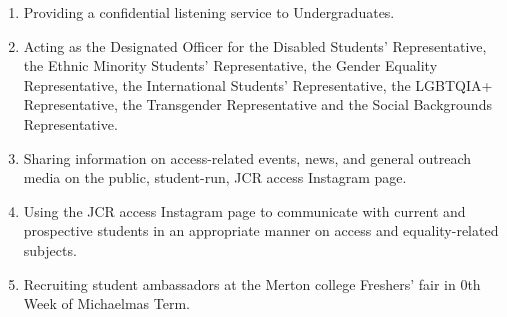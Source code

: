 \begin{enumerate}
	\item Providing a confidential listening service to Undergraduates.
	\item Acting as the Designated Officer for the Disabled Students’ Representative, the Ethnic Minority Students’ Representative, the Gender Equality Representative, the International Students’ Representative, the LGBTQIA+ Representative, the Transgender Representative and the Social Backgrounds Representative.
	\item Sharing information on access-related events, news, and general outreach media on the public, student-run, JCR access Instagram page. 
	\item Using the JCR access Instagram page to communicate with current and prospective students in an appropriate manner on access and equality-related subjects. 
	\item Recruiting student ambassadors at the Merton college Freshers' fair in 0th Week of Michaelmas Term.
	
\end{enumerate}
